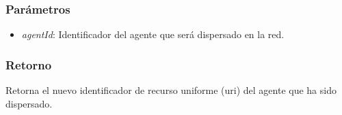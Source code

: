 \documentclass{article}
\begin{document}
\subsubsection*{Parámetros}
\begin{itemize}
\item \textit{agentId}: Identificador del agente que será dispersado en la red.
\end{itemize}
\subsubsection*{Retorno}
Retorna el nuevo identificador de recurso uniforme (uri) del agente que ha sido dispersado.
\end{document}
